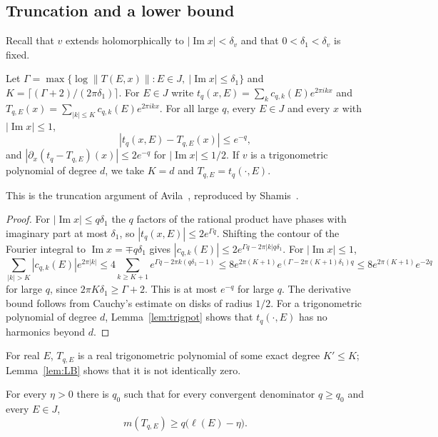 \subsection{Truncation and a lower bound}\label{sec:LB}

Recall that $v$ extends holomorphically to $|\operatorname{Im}x|<\delta_v$ and that $0<\delta_1<\delta_v$ is fixed.

\begin{lemma}[Truncation]\label{lem:TR}
Let $\Gamma=\max\{\log\|T(E,x)\|:E\in J,\ |\operatorname{Im}x|\le\delta_1\}$ and $K=\lceil(\Gamma+2)/(2\pi\delta_1)\rceil$. For $E\in J$ write $t_q(x,E)=\sum_kc_{q,k}(E)e^{2\pi ikx}$ and $T_{q,E}(x)=\sum_{|k|\le K}c_{q,k}(E)e^{2\pi ikx}$. For all large $q$, every $E\in J$ and every $x$ with $|\operatorname{Im}x|\le1$,
\[
|t_q(x,E)-T_{q,E}(x)|\le e^{-q},
\]
and $|\partial_x(t_q-T_{q,E})(x)|\le2e^{-q}$ for $|\operatorname{Im}x|\le1/2$. If $v$ is a trigonometric polynomial of degree $d$, we take $K=d$ and $T_{q,E}=t_q(\cdot,E)$.
\end{lemma}

This is the truncation argument of Avila~\cite[Section~2, equations (10)--(11)]{Avila2015}, reproduced by Shamis~\cite[Lemma~2.1]{Shamis2011}.

\begin{proof}
For $|\operatorname{Im}x|\le q\delta_1$ the $q$ factors of the rational product have phases with imaginary part at most $\delta_1$, so $|t_q(x,E)|\le2e^{\Gamma q}$. Shifting the contour of the Fourier integral to $\operatorname{Im}x=\mp q\delta_1$ gives $|c_{q,k}(E)|\le2e^{\Gamma q-2\pi|k|q\delta_1}$. For $|\operatorname{Im}x|\le1$,
\[
\sum_{|k|>K}|c_{q,k}(E)|e^{2\pi|k|}\le4\sum_{k\ge K+1}e^{\Gamma q-2\pi k(q\delta_1-1)}\le8e^{2\pi(K+1)}e^{(\Gamma-2\pi(K+1)\delta_1)q}\le8e^{2\pi(K+1)}e^{-2q}
\]
for large $q$, since $2\pi K\delta_1\ge\Gamma+2$. This is at most $e^{-q}$ for large $q$. The derivative bound follows from Cauchy's estimate on disks of radius $1/2$. For a trigonometric polynomial of degree $d$, Lemma~\ref{lem:trigpot} shows that $t_q(\cdot,E)$ has no harmonics beyond $d$.
\end{proof}

For real $E$, $T_{q,E}$ is a real trigonometric polynomial of some exact degree $K'\le K$; Lemma~\ref{lem:LB} shows that it is not identically zero.

\begin{lemma}\label{lem:LB}
For every $\eta>0$ there is $q_0$ such that for every convergent denominator $q\ge q_0$ and every $E\in J$,
\[
m(T_{q,E})\ge q\bigl(\ell(E)-\eta\bigr).
\]
\end{lemma}

